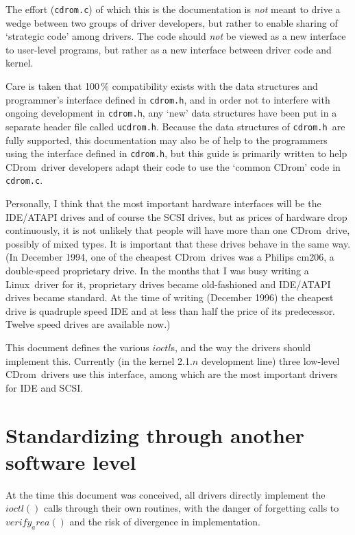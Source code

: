 \documentclass{article}
\def\linux{{\sc Linux}}
\def\cdrom{{\sc CDrom}}
\def\cdromc{{\tt cdrom.c}}
\def\cdromh{{\tt cdrom.h}}
\def\ucdrom{{\tt ucdrom.h}}
\begin{document}
The effort (\cdromc) of which this is the documentation is {\em not\/}
meant to drive a wedge between two groups of driver developers, but
rather to enable sharing of `strategic code' among drivers. The code
should {\em not\/} be viewed as a new interface to user-level
programs, but rather as a new interface between driver code and
kernel. 

Care is taken that 100\,\% compatibility exists with the data
structures and programmer's interface defined in \cdromh, and in order
not to interfere with ongoing development in \cdromh, any `new' data
structures have been put in a separate header file called \ucdrom.
Because the data structures of \cdromh\ are fully supported, this
documentation may also be of help to the programmers using the
interface defined in \cdromh, but this guide is primarily written to
help \cdrom\ driver developers adapt their code to use the `common
\cdrom' code in \cdromc.

Personally, I think that the most important hardware interfaces will
be the IDE/ATAPI drives and of course the SCSI drives, but as prices
of hardware drop continuously, it is not unlikely that people will
have more than one \cdrom\ drive, possibly of mixed types. It is
important that these drives behave in the same way. (In December 1994,
one of the cheapest \cdrom\ drives was a Philips cm206, a double-speed
proprietary drive. In the months that I was busy writing a \linux\ 
driver for it, proprietary drives became old-fashioned and IDE/ATAPI
drives became standard. At the time of writing (December 1996) the
cheapest drive is quadruple speed IDE and at less than half the price
of its predecessor. Twelve speed drives are available now.)

This document defines the various $ioctl$s, and the way the drivers
should implement this. Currently (in the kernel 2.1.$n$ development
line) three low-level \cdrom\ drivers use this interface, among
which are the most important drivers for IDE and SCSI. 

\section{Standardizing through another software level}
\label{cdrom.c}

At the time this document was conceived, all drivers directly implement
the $ioctl()$ calls through their own routines, with the danger of
forgetting calls to $verify_area()$ and the risk of divergence in
implementation. 
\end{document}
